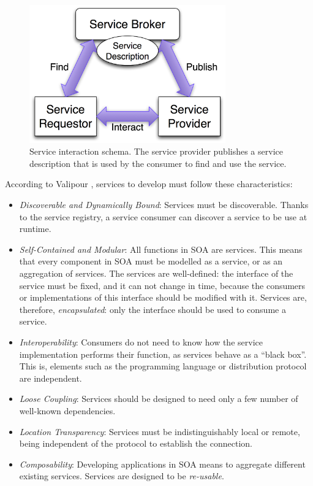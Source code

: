 \begin{figure}
\centering
\includegraphics[width=20pc]{gfx/soa/soaDiagram.jpg}
\caption{Service interaction schema. The service provider publishes a
  service description that is used by the consumer to find and use the
  service.} %
\label{fig:soadiagram}
\end{figure}



According to Valipour \cite{Valipour09surveysoa}, services to develop must follow these characteristics:

\begin{itemize}
\item {\em Discoverable and Dynamically Bound}: Services must be discoverable. Thanks to the service registry, a service consumer can discover a service to be use at runtime.
\item {\em Self-Contained and Modular}: All functions in SOA are services. This means that every
  component in SOA must be modelled as a service, or as an aggregation of services. The services are well-defined: the interface of the service must be fixed, and it can not change in time, because the consumers or implementations of this interface should be modified with it. Services are, therefore, {\em encapsulated}: only the interface should be used to consume a service.
\item {\em Interoperability}: Consumers do not need to know how the service implementation performs their function, as services behave as a ``black box''. This is, elements such as the programming language or distribution protocol are independent.
\item {\em Loose Coupling}: Services should be designed to need only a few number of well-known dependencies.
\item {\em Location Transparency}: Services must be indistinguishably local or remote, being independent of the protocol to establish the connection.
\item {\em Composability}: Developing applications in SOA means to aggregate different existing services. Services are designed to be {\em re-usable}.
\end{itemize}



